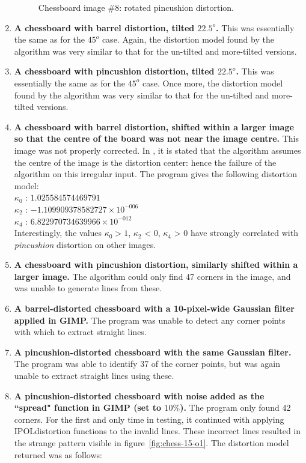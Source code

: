 \begin{enumerate}
\begin{figure}[h]
  \caption{Chessboard image \#8: rotated pincushion distortion.}
  \label{fig:chess-8}
\end{figure}
  \item \textbf{A chessboard with barrel distortion, tilted $22.5^o$.} This was essentially the same as for the $45^o$ case. Again, the distortion model found by the algorithm was very similar to that for the un-tilted and more-tilted versions.
  \item \textbf{A chessboard with pincushion distortion, tilted $22.5^o$.} This was essentially the same as for the $45^o$ case. Once more, the distortion model found by the algorithm was very similar to that for the un-tilted and more-tilted versions.
  \item \textbf{A chessboard with barrel distortion, shifted within a larger image so that the centre of the board was not near the image centre.} This image was not properly corrected. In \cite{algebraic-distortion}, it is stated that the algorithm assumes the centre of the image is the distortion center: hence the failure of the algorithm on this irregular input. The program gives the following distortion model:\\
   $ \kappa_{0}$ : $1.025584574469791$\\
   $ \kappa_{2}$ : $-1.109909378582727 \times 10^{-006}$\\
   $ \kappa_{4}$ : $6.822970734639966 \times 10^{-012}$\\
   Interestingly, the values $\kappa_{0} > 1$, $\kappa_{2}$ < 0, $\kappa_{4}$ > 0 have strongly correlated with \emph{pincushion} distortion on other images.
  \item \textbf{A chessboard with pincushion distortion, similarly shifted within a larger image.} The algorithm could only find 47 corners in the image, and was unable to generate lines from these.
  \item \textbf{A barrel-distorted chessboard with a 10-pixel-wide Gaussian filter applied in GIMP.} The program was unable to detect any corner points with which to extract straight lines.
  \item \textbf{A pincushion-distorted chessboard with the same Gaussian filter.} The program was able to identify 37 of the corner points, but was again unable to extract straight lines using these.
  \item \textbf{A pincushion-distorted chessboard with noise added as the ``spread" function in GIMP (set to $10\%$).} The program only found 42 corners. For the first and only time in testing, it continued with applying IPOLdistortion functions to the invalid lines. These incorrect lines resulted in the strange pattern visible in figure~\ref{fig:chess-15-o1}. The distortion model returned was as follows:\\

\end{enumerate}
